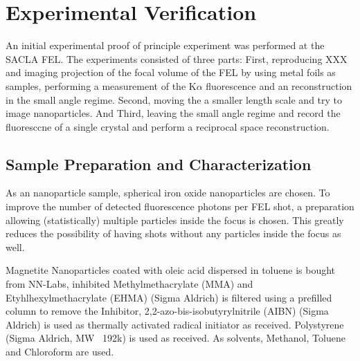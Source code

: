 \chapter{Experimental Verification}
\label{chap:experiment}
An initial experimental proof of principle experiment was performed at the SACLA FEL.
The experiments consisted of three parts: First, reproducing XXX and imaging projection of the focal volume of the FEL by using metal foils as samples, performing a measurement of the K$\alpha$  fluorescence and an reconstruction in the small angle regime. Second, moving the a smaller length scale and try to image nanoparticles. And Third, leaving the small angle regime and record the fluoresccne of a single crystal and perform a reciprocal space reconstruction.
\section{Sample Preparation and Characterization}
As an nanoparticle sample, spherical iron oxide nanoparticles are chosen. To improve the number of detected fluorescence photons per FEL shot, a preparation allowing (statistically) multiple particles inside the focus is chosen. This greatly reduces the possibility of having shots without any particles inside the focus as well.

Magnetite Nanoparticles coated with oleic acid dispersed in toluene is bought from NN-Labs, inhibited Methylmethacrylate (MMA) and Etyhlhexylmethacrylate (EHMA)  (Sigma Aldrich) is filtered using a prefilled column to remove the Inhibitor,  2,2-azo-bis-isobutyrylnitrile (AIBN) (Sigma Aldrich) is used as thermally activated radical initiator as received. Polystyrene (Sigma Aldrich, MW ~192k) is used as received. As solvents, Methanol, Toluene and Chloroform are used.
